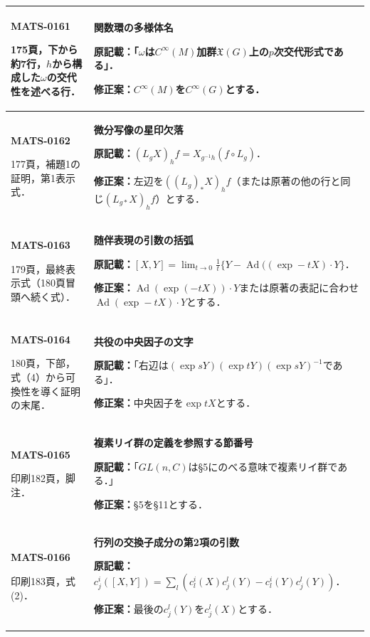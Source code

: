 \documentclass[a4paper,10pt]{ltjsarticle}
\begin{document}
\begin{longtable}{@{}>{\raggedright\arraybackslash}p{.19\linewidth}>{\raggedright\arraybackslash}p{.77\linewidth}@{}}
\hline
\hypertarget{MATS-0161}{}\textbf{MATS-0161}\par 175頁，下から約7行，$h$から構成した$\omega$の交代性を述べる行． & \textbf{関数環の多様体名}\par\textbf{原記載：}「$\omega$は$C^\infty(M)$加群$\mathfrak X(G)$上の$p$次交代形式である」．\par\textbf{修正案：}$C^\infty(M)$を$C^\infty(G)$とする． \\[3pt]
\hline
\hypertarget{MATS-0162}{}\textbf{MATS-0162}\par 177頁，補題1の証明，第1表示式． & \textbf{微分写像の星印欠落}\par\textbf{原記載：}$(L_gX)_hf=X_{g^{-1}h}(f\circ L_g)$．\par\textbf{修正案：}左辺を$((L_g)_*X)_hf$（または原著の他の行と同じ$ (L_{g*}X)_hf$）とする． \\[3pt]
\hline
\hypertarget{MATS-0163}{}\textbf{MATS-0163}\par 179頁，最終表示式（180頁冒頭へ続く式）． & \textbf{随伴表現の引数の括弧}\par\textbf{原記載：}$\displaystyle [X,Y]=\lim_{t\to0}\frac1t\{Y-\operatorname{Ad}((\exp-tX)\cdot Y\}$．\par\textbf{修正案：}$\operatorname{Ad}(\exp(-tX))\cdot Y$または原著の表記に合わせ$\operatorname{Ad}(\exp-tX)\cdot Y$とする． \\[3pt]
\hline
\hypertarget{MATS-0164}{}\textbf{MATS-0164}\par 180頁，下部，式（4）から可換性を導く証明の末尾． & \textbf{共役の中央因子の文字}\par\textbf{原記載：}「右辺は$(\exp sY)(\exp tY)(\exp sY)^{-1}$である」．\par\textbf{修正案：}中央因子を$\exp tX$とする． \\[3pt]
\hline
\hypertarget{MATS-0165}{}\textbf{MATS-0165}\par 印刷182頁，脚注． & \textbf{複素リイ群の定義を参照する節番号}\par\textbf{原記載：}「$GL(n,C)$は§5にのべる意味で複素リイ群である．」\par\textbf{修正案：}§5を§11とする． \\[3pt]
\hline
\hypertarget{MATS-0166}{}\textbf{MATS-0166}\par 印刷183頁，式(2)． & \textbf{行列の交換子成分の第2項の引数}\par\textbf{原記載：}$c_j^i([X,Y])=\sum_l(c_l^i(X)c_j^l(Y)-c_l^i(Y)c_j^l(Y))$．\par\textbf{修正案：}最後の$c_j^l(Y)$を$c_j^l(X)$とする． \\[3pt]

\end{longtable}
\end{document}
